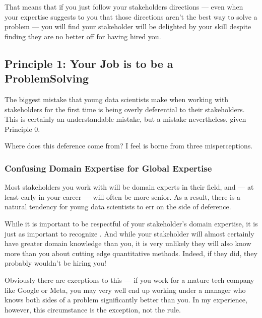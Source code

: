 \documentclass[letterpaper,10pt,english]{jupyterBook}
\begin{document}
\sphinxAtStartPar
That means that if you just follow your stakeholders directions — even when your expertise suggests to you that those directions aren’t the best way to solve a problem — you will  find your stakeholder will be delighted by your skill despite finding they are no better off for having hired you.


\subsection{Principle 1: Your Job is to be a Problem\sphinxhyphen{}Solving }
\label{\detokenize{20_problems_to_questions/20_stakeholder_management:principle-1-your-job-is-to-be-a-problem-solving-partner}}
\sphinxAtStartPar
The biggest mistake that young data scientists make when working with stakeholders for the first time is being overly deferential to their stakeholders. This is certainly an understandable mistake, but a mistake nevertheless, given Principle 0.

\sphinxAtStartPar
Where does this deference come from? I feel is borne from three misperceptions.


\subsubsection{Confusing Domain Expertise for Global Expertise}
\label{\detokenize{20_problems_to_questions/20_stakeholder_management:confusing-domain-expertise-for-global-expertise}}
\sphinxAtStartPar
Most stakeholders you work with will be domain experts in their field, and — at least early in your career — will often be more senior. As a result, there is a natural tendency for young data scientists to err on the side of deference.

\sphinxAtStartPar
While it is important to be respectful of your stakeholder’s domain expertise, it is just as important to recognize . And while your stakeholder will almost certainly have greater domain knowledge than you, it is very unlikely they will also know more than you about cutting edge quantitative methods. Indeed, if they did, they probably wouldn’t be hiring you!%
\begin{footnote}[1]\sphinxAtStartFootnote
Obviously there are exceptions to this — if you work for a mature tech company like Google or Meta, you may very well end up working under a manager who knows both sides of a problem significantly better than you. In my experience, however, this circumstance is the exception, not the rule.
%
\end{footnote}
\end{document}
